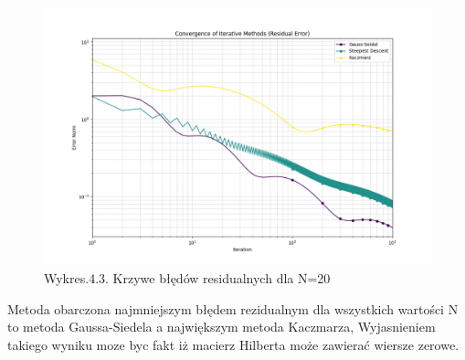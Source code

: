 \documentclass{article}
\begin{document}
\begin{figure}[H]
  \includegraphics[width=1.5\textwidth, center]{zad4_3.png}
  \centering
  \captionsetup[Tabela]{name=New Table Name}
  \caption*{Wykres.4.3. Krzywe błędów residualnych dla N=20}
\end{figure}

Metoda obarczona najmniejszym błędem rezidualnym dla wszystkich wartości N to metoda Gaussa-Siedela a największym metoda Kaczmarza,
Wyjasnieniem takiego wyniku moze byc fakt iż  macierz Hilberta może zawierać wiersze zerowe.
\end{document}
